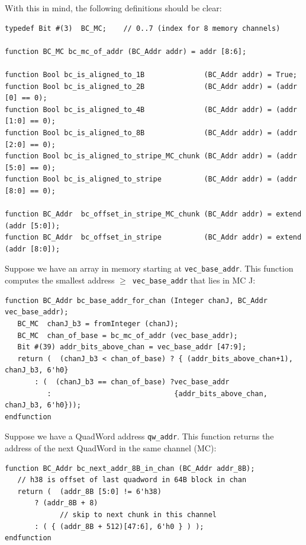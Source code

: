 \documentclass[twoside,letterpaper,11pt]{article}
\begin{document}
With this in mind, the following definitions should be clear:

\begin{Verbatim}[frame=single, label=BC\_HW\_IFC.bsv]  
typedef Bit #(3)  BC_MC;    // 0..7 (index for 8 memory channels)

function BC_MC bc_mc_of_addr (BC_Addr addr) = addr [8:6];

function Bool bc_is_aligned_to_1B              (BC_Addr addr) = True;
function Bool bc_is_aligned_to_2B              (BC_Addr addr) = (addr [0] == 0);
function Bool bc_is_aligned_to_4B              (BC_Addr addr) = (addr [1:0] == 0);
function Bool bc_is_aligned_to_8B              (BC_Addr addr) = (addr [2:0] == 0);
function Bool bc_is_aligned_to_stripe_MC_chunk (BC_Addr addr) = (addr [5:0] == 0);
function Bool bc_is_aligned_to_stripe          (BC_Addr addr) = (addr [8:0] == 0);

function BC_Addr  bc_offset_in_stripe_MC_chunk (BC_Addr addr) = extend (addr [5:0]);
function BC_Addr  bc_offset_in_stripe          (BC_Addr addr) = extend (addr [8:0]);
\end{Verbatim}

Suppose we have an array in memory starting at \verb|vec_base_addr|.
This function computes the smallest address $\geq$~\verb|vec_base_addr|
that lies in MC J:

\begin{Verbatim}[frame=single, label=BC\_HW\_IFC.bsv] 
function BC_Addr bc_base_addr_for_chan (Integer chanJ, BC_Addr vec_base_addr);
   BC_MC  chanJ_b3 = fromInteger (chanJ);
   BC_MC  chan_of_base = bc_mc_of_addr (vec_base_addr);
   Bit #(39) addr_bits_above_chan = vec_base_addr [47:9];
   return (  (chanJ_b3 < chan_of_base) ? { (addr_bits_above_chan+1), chanJ_b3, 6'h0}
	   : (  (chanJ_b3 == chan_of_base) ?vec_base_addr
	      :                             {addr_bits_above_chan, chanJ_b3, 6'h0}));
endfunction
\end{Verbatim}

Suppose we have a QuadWord address \verb|qw_addr|.  This function
returns the address of the next QuadWord in the same channel (MC):
\begin{Verbatim}[frame=single, label=BC\_HW\_IFC.bsv] 
function BC_Addr bc_next_addr_8B_in_chan (BC_Addr addr_8B);
   // h38 is offset of last quadword in 64B block in chan
   return (  (addr_8B [5:0] != 6'h38)
	   ? (addr_8B + 8)
             // skip to next chunk in this channel
	   : ( { (addr_8B + 512)[47:6], 6'h0 } ) );
endfunction
\end{Verbatim}
\end{document}
